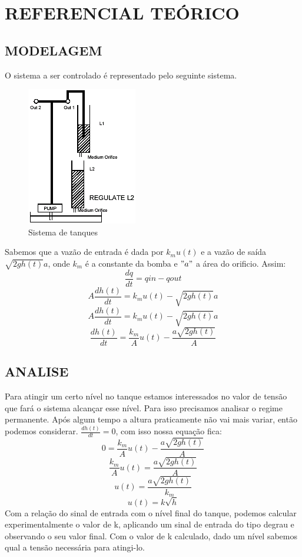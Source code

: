 \documentclass[a4paper,12pt]{article}
\begin{document}
\newpage


\thispagestyle{main}

\section{REFERENCIAL TEÓRICO}

\subsection{MODELAGEM}
\hspace{4ex}O sistema a ser controlado é representado pelo seguinte sistema.
\begin{figure}[h]
\includegraphics[scale=1]{tanques.png}
\caption{Sistema de tanques}
\label{fig:tanques}
\end{figure}

\hspace{4ex}Sabemos que a vazão de entrada é dada por $ k_mu(t) $ e a vazão de saída $ \sqrt{2gh(t)}a $, onde $k_m$ é a constante da bomba e $"a"$ a área do orificio. Assim: 
\[ \frac{dq}{dt}=qin-qout\]
\[ A\frac{dh(t)}{dt}=k_mu(t)-\sqrt{2gh(t)}a \]
\[ A\frac{dh(t)}{dt}=k_mu(t)-\sqrt{2gh(t)}a \]
\[ \frac{dh(t)}{dt}= \frac{k_m}{A}u(t)- \frac{a\sqrt{2gh(t)}}{A} \]

\subsection{ANALISE}
\hspace{4ex}Para atingir um certo nível no tanque estamos interessados no valor de tensão que fará o sistema alcançar esse nível. Para isso precisamos analisar o regime permanente. Após algum tempo a altura praticamente não vai mais variar, então podemos considerar.  $\frac{dh(t)}{dt}=0 $, com isso nossa equação fica:
\[ 0= \frac{k_m}{A}u(t)- \frac{a\sqrt{2gh(t)}}{A} \]
\[ \frac{k_m}{A}u(t)= \frac{a\sqrt{2gh(t)}}{A} \]
\[ u(t)=  \frac{a\sqrt{2gh(t)}}{k_m}\]
\begin{equation}\label{eq:1}
u(t)=k\sqrt{h}
\end{equation}
\hspace{4ex}Com a relação do sinal de entrada com o nível final do tanque, podemos calcular experimentalmente o valor de k, aplicando um sinal de entrada do tipo degrau e observando o seu valor final.
Com o valor de k calculado, dado um nível sabemos qual a tensão necessária para atingi-lo.
\end{document}

